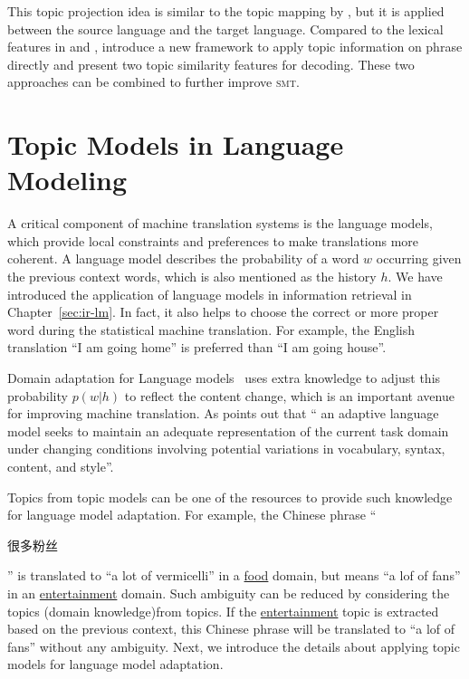 This topic projection idea is similar to the topic mapping by \citet{su-12}, but it is applied between the source language and the target language. Compared to the lexical features in \citet{Eidelman-12} and \citet{hu-14}, \citet{xiao-12} introduce a new framework to apply topic information on phrase directly and present two topic similarity features for decoding. These two approaches can be combined to further improve \textsc{smt}.



\section{Topic Models in Language Modeling}


A critical component of machine translation systems is the language models, which provide local constraints and preferences to make translations more coherent. A language model describes the probability of a word $w$ occurring given the previous context words, which is also mentioned as the history $h$. We have introduced the application of language models in information retrieval in Chapter~\ref{sec:ir-lm}. In fact, it also helps to choose the correct or more proper word during the statistical machine translation. For example, the English translation ``I am going home'' is preferred than ``I am going house''. 

Domain adaptation for Language models~\citep{Bellegarda-04,wood-09} uses extra knowledge to adjust this probability $p(w|h)$ to reflect the content change, which is an important avenue for improving machine translation. As \citet{Bellegarda-04} points out that `` an adaptive language model seeks to maintain an adequate representation of the current task domain under changing conditions involving potential variations in vocabulary, syntax, content, and style''.

Topics from topic models can be one of the resources to provide such knowledge for language model adaptation. For example, the Chinese phrase ``\begin{CJK*}{UTF8}{gbsn}很多粉丝\end{CJK*}'' is translated to ``a lot of vermicelli'' in a \underline{food} domain, but means ``a lof of fans'' in an \underline{entertainment} domain. Such ambiguity can be reduced by considering the topics (domain knowledge)from topics. If the \underline{entertainment} topic is extracted based on the previous context, this Chinese phrase will be translated to ``a lof of fans'' without any ambiguity. Next, we introduce the details about applying topic models for language model adaptation.

